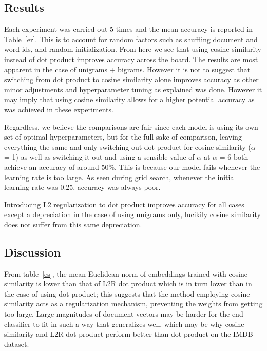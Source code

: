 \documentclass[11pt,a4paper]{article}
\begin{document}
\subsection{Results}

Each experiment was carried out 5 times and the mean accuracy is reported in Table~\ref{er}. This is to account for random factors such as shuffling document and word ids, and random initialization. From here we see that using cosine similarity instead of dot product improves accuracy across the board. The results are most apparent in the case of unigrams + bigrams. However it is not to suggest that switching from dot product to cosine similarity alone improves accuracy as other minor adjustments and hyperparameter tuning as explained was done. However it may imply that using cosine similarity allows for a higher potential accuracy as was achieved in these experiments. 

Regardless, we believe the comparisons are fair since each model is using its own set of optimal 
hyperparameters, but for the full sake of comparison, leaving everything the same and only switching out
dot product for cosine similarity ($\alpha$ = 1) as well as switching it out and using a sensible value of $\alpha$
at $\alpha$ = 6 both achieve an accuracy of around 50\%. This is because our model fails whenever the learning
rate is too large. As seen during grid search, whenever the initial learning rate was 0.25,
accuracy was always poor. 

Introducing L2 regularization to dot product improves accuracy for all cases except a depreciation in the case of using unigrams only, lucikily cosine similarity does not suffer from this same depreciation.  





\subsection{Discussion}

From table~\ref{es}, the mean Euclidean norm of embeddings trained with cosine similarity is lower than that of L2R dot product which is in turn lower than in the case of using dot product; this suggests that the method employing cosine similarity acts as a regularization mechanism, preventing the weights from getting too large. Large magnitudes of document vectors may be harder for the end classifier to fit in such a way that generalizes well, which may be why cosine similarity and L2R dot product perform better than dot product on the
IMDB dataset. 
\end{document}
